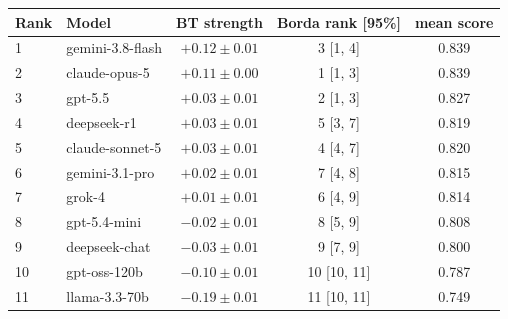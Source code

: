 \begin{tabular}{llccc}
\toprule
Rank & Model & BT strength & Borda rank [95\%] & mean score \\
\midrule
1 & gemini-3.8-flash & $+0.12 \pm 0.01$ & 3 [1, 4] & 0.839 \\
2 & claude-opus-5 & $+0.11 \pm 0.00$ & 1 [1, 3] & 0.839 \\
3 & gpt-5.5 & $+0.03 \pm 0.01$ & 2 [1, 3] & 0.827 \\
4 & deepseek-r1 & $+0.03 \pm 0.01$ & 5 [3, 7] & 0.819 \\
5 & claude-sonnet-5 & $+0.03 \pm 0.01$ & 4 [4, 7] & 0.820 \\
6 & gemini-3.1-pro & $+0.02 \pm 0.01$ & 7 [4, 8] & 0.815 \\
7 & grok-4 & $+0.01 \pm 0.01$ & 6 [4, 9] & 0.814 \\
8 & gpt-5.4-mini & $-0.02 \pm 0.01$ & 8 [5, 9] & 0.808 \\
9 & deepseek-chat & $-0.03 \pm 0.01$ & 9 [7, 9] & 0.800 \\
10 & gpt-oss-120b & $-0.10 \pm 0.01$ & 10 [10, 11] & 0.787 \\
11 & llama-3.3-70b & $-0.19 \pm 0.01$ & 11 [10, 11] & 0.749 \\
\bottomrule
\end{tabular}
